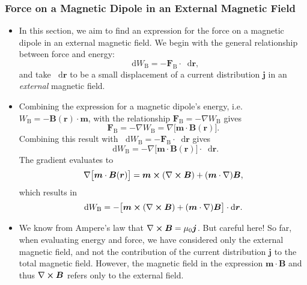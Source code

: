 \documentclass[11pt, a4paper]{article}
\newcommand{\diff}{\mathop{}\!\mathrm{d}} %
\renewcommand{\vec}[1]{\bm{#1}} %
\renewcommand{\r}{\vec{r}}
\newcommand{\B}{\vec{B}} %
\newcommand{\mm}{\mu_{0}}  %
\newcommand{\m}{\vec{m}}  %
\renewcommand{\j}{\vec{j}}  %
\renewcommand{\curl}{\nabla \cross}
\renewcommand{\grad}{\nabla}
\begin{document}
\begin{itemize}
\end{itemize}



\subsubsection{Force on a Magnetic Dipole in an External Magnetic Field}
\begin{itemize}
	\item In this section, we aim to find an expression for the force on a magnetic dipole in an external magnetic field. We begin with the general relationship between force and energy:
	\begin{equation*}
		\diff W_{\text{B}} = - \vec{F}_{\text{B}} \cdot \diff \r,
	\end{equation*}
	and take $ \diff \r $ to be a small displacement of a current distribution $ \j $ in an \textit{external} magnetic field.
	
    \item Combining the expression for a magnetic dipole's energy, i.e. $ W_{\text{B}} = - \B(\r) \cdot \m $, with the relationship $ \vec{F}_{\text{B}} = - \grad W_{\text{B}}  $ gives
    \begin{equation*}
        \vec{F}_{\text{B}} = - \grad W_{\text{B}} = \grad \big[ \m \cdot \B(\r) \big].
    \end{equation*}
    Combining this result with $ \diff W_{\text{B}} = - \vec{F}_{\text{B}} \cdot \diff \r $ gives
	\begin{equation*}
		\diff W_{\text{B}} = - \grad\big[\m \cdot \B(\r)\big] \cdot \diff \r.
	\end{equation*}
	The gradient evaluates to 
	\begin{equation*}
		\grad\big[\m \cdot \B(\r)\big] = \m \cross (\curl \B) + (\m \cdot \grad)\B,
	\end{equation*}
    which results in
    \begin{equation*}
        \diff W_{\text{B}} = - \big[ \m \cross (\curl \B) + (\m \cdot \grad)\B \big] \cdot \diff \r.
    \end{equation*}
    
	\item We know from Ampere's law that $ \curl \B = \mm \j $. But careful here! So far, when evaluating energy and force, we have considered only the external magnetic field, and not the contribution of the current distribution $ \j $ to the total magnetic field. However, the magnetic field in the expression $ \m \cdot \B $ and thus $ \curl \B $ refers only to the external field.
	

\end{itemize}
\end{document}
